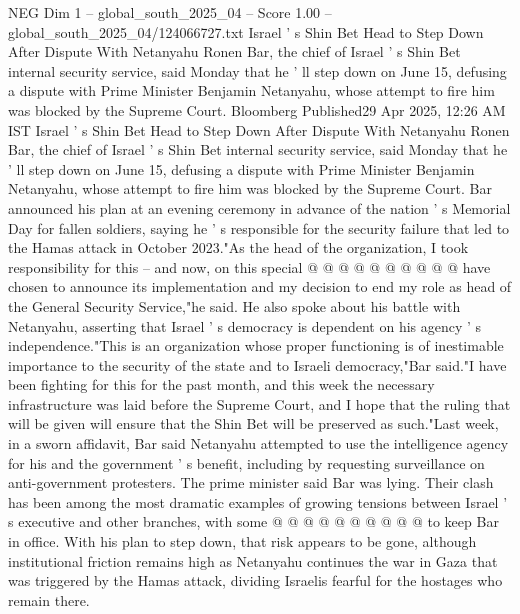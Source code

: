 \begin{textsample}{NEG Dim 1 – global\_south\_2025\_04 – Score 1.00 – global\_south\_2025\_04/124066727.txt}  \label{ex:f1_neg_165}
Israel ' s Shin Bet Head to Step Down After Dispute With Netanyahu Ronen Bar, the chief of Israel ' s Shin Bet internal security service, said Monday that he ' ll step down on June 15, defusing a dispute with Prime Minister Benjamin Netanyahu, whose attempt to fire him was blocked by the Supreme Court.
Bloomberg Published29 Apr 2025, 12:26 AM IST Israel ' s Shin Bet Head to Step Down After Dispute With Netanyahu Ronen Bar, the chief of Israel ' s Shin Bet internal security service, said Monday that he ' ll step down on June 15, defusing a dispute with Prime Minister Benjamin Netanyahu, whose attempt to fire him was blocked by the Supreme Court.
Bar announced his plan at an evening ceremony in advance of the nation ' s Memorial Day for fallen soldiers, saying he ' s responsible for the security failure that led to the Hamas attack in October 2023."As the head of the organization, I took responsibility for this -- and now, on this special @ @ @ @ @ @ @ @ @ @ have chosen to announce its implementation and my decision to end my role as head of the General Security Service,"he said.
He also spoke about his battle with Netanyahu, asserting that Israel ' s democracy is dependent on his agency ' s independence."This is an organization whose proper functioning is of inestimable importance to the security of the state and to Israeli democracy,"Bar said."I have been fighting for this for the past month, and this week the necessary infrastructure was laid before the Supreme Court, and I hope that the ruling that will be given will ensure that the Shin Bet will be preserved as such."Last week, in a sworn affidavit, Bar said Netanyahu attempted to use the intelligence agency for his and the government ' s benefit, including by requesting surveillance on anti-government protesters.
The prime minister said Bar was lying.
Their clash has been among the most dramatic examples of growing tensions between Israel ' s executive and other branches, with some @ @ @ @ @ @ @ @ @ @ to keep Bar in office.
With his plan to step down, that risk appears to be gone, although institutional friction remains high as Netanyahu continues the war in Gaza that was triggered by the Hamas attack, dividing Israelis fearful for the hostages who remain there.

\end{textsample}
